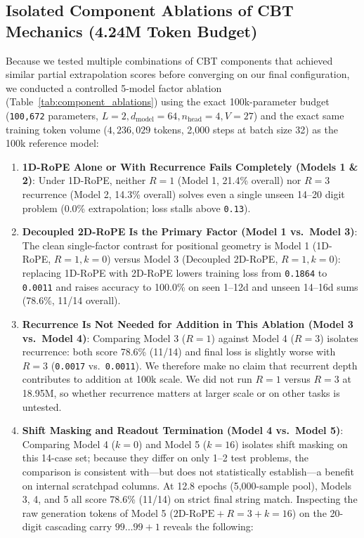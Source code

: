 \documentclass[10pt,twocolumn]{article}
\begin{document}
\subsection{Isolated Component Ablations of CBT Mechanics (4.24M Token Budget)}

Because we tested multiple combinations of CBT components that achieved similar partial extrapolation scores before converging on our final configuration, we conducted a controlled 5-model factor ablation (Table~\ref{tab:component_ablations}) using the exact 100k-parameter budget (\texttt{100,672} parameters, $L=2, d_{\text{model}}=64, n_{\text{head}}=4, V=27$) and the exact same training token volume ($4,236,029$ tokens, 2,000 steps at batch size 32) as the 100k reference model:

\begin{enumerate}[leftmargin=*,nosep]
    \item \textbf{1D-RoPE Alone or With Recurrence Fails Completely (Models 1 \& 2)}: Under 1D-RoPE, neither $R=1$ (Model 1, 21.4\% overall) nor $R=3$ recurrence (Model 2, 14.3\% overall) solves even a single unseen 14--20 digit problem (0.0\% extrapolation; loss stalls above \texttt{0.13}).
    \item \textbf{Decoupled 2D-RoPE Is the Primary Factor (Model 1 vs.\ Model 3)}: The clean single-factor contrast for positional geometry is Model 1 (1D-RoPE, $R=1, k=0$) versus Model 3 (Decoupled 2D-RoPE, $R=1, k=0$): replacing 1D-RoPE with 2D-RoPE lowers training loss from \texttt{0.1864} to \texttt{0.0011} and raises accuracy to 100.0\% on seen 1--12d and unseen 14--16d sums (78.6\%, 11/14 overall).
    \item \textbf{Recurrence Is Not Needed for Addition in This Ablation (Model 3 vs.\ Model 4)}: Comparing Model 3 ($R=1$) against Model 4 ($R=3$) isolates recurrence: both score 78.6\% (11/14) and final loss is slightly worse with $R=3$ (\texttt{0.0017} vs.\ \texttt{0.0011}). We therefore make no claim that recurrent depth contributes to addition at 100k scale. We did not run $R=1$ versus $R=3$ at 18.95M, so whether recurrence matters at larger scale or on other tasks is untested.
    \item \textbf{Shift Masking and Readout Termination (Model 4 vs.\ Model 5)}: Comparing Model 4 ($k=0$) and Model 5 ($k=16$) isolates shift masking on this 14-case set; because they differ on only 1--2 test problems, the comparison is consistent with—but does not statistically establish—a benefit on internal scratchpad columns. At 12.8 epochs (5,000-sample pool), Models 3, 4, and 5 all score 78.6\% (11/14) on strict final string match. Inspecting the raw generation tokens of Model 5 ($2\text{D-RoPE} + R=3 + k=16$) on the 20-digit cascading carry $99\dots99 + 1$ reveals the following:

\end{enumerate}
\end{document}
